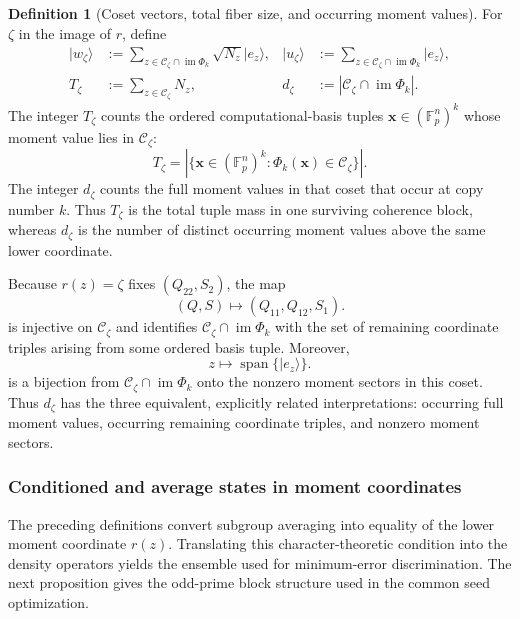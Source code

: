 \documentclass[11pt]{article}
\newcommand{\F}{\mathbb F}
\newcommand{\1}{\mathbf 1}
\theoremstyle{plain}
\theoremstyle{definition}
\newtheorem{definition}[theorem]{Definition}
\theoremstyle{remark}
\begin{document}
\begin{definition}[Coset vectors, total fiber size, and occurring moment values]
For $\zeta$ in the image of $r$, define
\begin{align}
 |w_{\zeta}\rangle
 &:=\sum_{z\in\mathcal C_{\zeta}\cap\operatorname{im}\Phi_k}
       \sqrt{N_z}|e_z\rangle,&
 |u_{\zeta}\rangle
 &:=\sum_{z\in\mathcal C_{\zeta}\cap\operatorname{im}\Phi_k}|e_z\rangle,
 \label{eq:w-u}\\
 T_{\zeta}
 &:=\sum_{z\in\mathcal C_{\zeta}}N_z,&
 d_{\zeta}
 &:=|\mathcal C_{\zeta}\cap\operatorname{im}\Phi_k|.
 \label{eq:early-Th-dh}
\end{align}
The integer $T_{\zeta}$ counts the ordered computational-basis tuples
$\boldsymbol x\in(\F_p^n)^k$ whose moment value lies in
$\mathcal C_{\zeta}$:
\begin{equation}
 T_{\zeta}
 =|\{\boldsymbol x\in(\F_p^n)^k:
       \Phi_k(\boldsymbol x)\in\mathcal C_{\zeta}\}|.
 \label{eq:T-zeta-counted-set}
\end{equation}
The integer $d_{\zeta}$ counts the full moment values in that coset that occur
at copy number $k$.  Thus $T_{\zeta}$ is the total tuple mass in one surviving
coherence block, whereas $d_{\zeta}$ is the number of distinct occurring
moment values above the same lower coordinate.

Because $r(z)=\zeta$ fixes $(Q_{22},S_2)$, the map
\begin{equation}
 (Q,S)\longmapsto(Q_{11},Q_{12},S_1).
 \label{eq:coset-to-remaining-coordinate-map}
\end{equation}
is injective on $\mathcal C_{\zeta}$ and identifies
$\mathcal C_{\zeta}\cap\operatorname{im}\Phi_k$ with the set of remaining
coordinate triples arising from some ordered basis tuple.  Moreover,
\begin{equation}
 z\longmapsto\operatorname{span}\{|e_z\rangle\}.
 \label{eq:occurring-moment-to-sector-map}
\end{equation}
is a bijection from
$\mathcal C_{\zeta}\cap\operatorname{im}\Phi_k$ onto the nonzero moment
sectors in this coset.  Thus $d_{\zeta}$ has the three equivalent, explicitly
related interpretations: occurring full moment values, occurring remaining
coordinate triples, and nonzero moment sectors.
\end{definition}

\subsubsection{Conditioned and average states in moment coordinates}
The preceding definitions convert subgroup averaging into equality of the lower moment coordinate $r(z)$.  Translating this character-theoretic condition into the density operators yields the ensemble used for minimum-error discrimination.  The next proposition gives the odd-prime block structure used in the common seed optimization.
\end{document}
